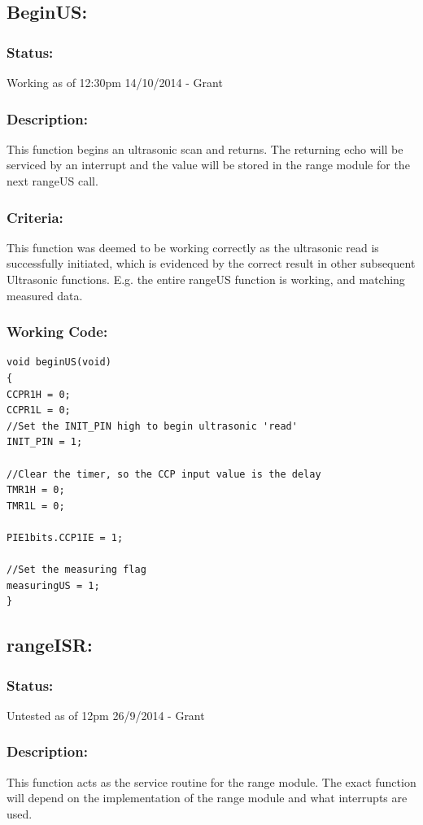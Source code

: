 \documentclass[]{report}
\begin{document}
\subsection{BeginUS:}
\subsubsection{Status:}
Working as of 12:30pm 14/10/2014 - Grant

\subsubsection{Description:}
This function begins an ultrasonic scan and returns. The returning echo will be serviced by an interrupt and the value will be stored in the range module for the next rangeUS call.

\subsubsection{Criteria:}
This function was deemed to be working correctly as the ultrasonic read is successfully initiated, which is evidenced by the correct result in other subsequent Ultrasonic functions. E.g. the entire rangeUS function is working, and matching measured data.

\subsubsection{Working Code:}
\begin{lstlisting}
void beginUS(void)
{
CCPR1H = 0;
CCPR1L = 0;
//Set the INIT_PIN high to begin ultrasonic 'read'
INIT_PIN = 1;

//Clear the timer, so the CCP input value is the delay
TMR1H = 0;
TMR1L = 0;

PIE1bits.CCP1IE = 1;

//Set the measuring flag
measuringUS = 1;
}
\end{lstlisting}

\subsection{rangeISR:}
\subsubsection{Status:}
Untested as of 12pm 26/9/2014 - Grant

\subsubsection{Description:}
This function acts as the service routine for the range module. The exact function will depend on the implementation of the range module and what interrupts are used.
\end{document}
